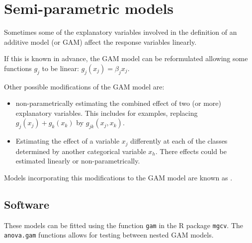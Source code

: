 \pagebreak
\section{Semi-parametric models}

Sometimes some of the explanatory variables involved in the
definition of an additive model (or GAM)
affect the response variables linearly.

If this is known in advance, the GAM model can be reformulated
allowing some functions $g_j$ to be linear:
$g_j(x_j) = \beta_j x_j$.

Other possible modifications of the GAM model are:
\begin{itemize}
    \item non-parametrically estimating the combined effect of two (or more)
        explanatory variables. This includes for examples, replacing
        $g_j(x_j) + g_k(x_k)$ by $g_{jk}(x_j, x_k)$.
    \item Estimating the effect of a variable $x_j$ differently at each of the
        classes determined by another categorical variable $x_h$. There
        effects could be estimated linearly or non-parametrically.
\end{itemize}

Models incorporating this modifications to the GAM model are known as
.

\subsection{Software}

These models can be fitted using the function \texttt{gam} in the R package
\texttt{mgcv}. The \texttt{anova.gam} functions allows for testing between
nested GAM models.
